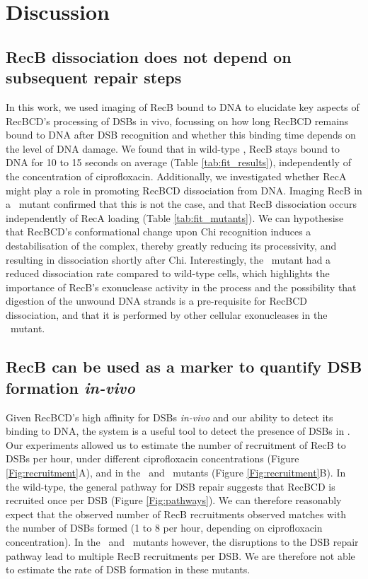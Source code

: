 \section*{Discussion}

\subsection*{RecB dissociation does not depend on subsequent repair steps}
In this work, we used imaging of RecB bound to DNA to elucidate key aspects of RecBCD's processing of DSBs in vivo, focussing on how long RecBCD remains bound to DNA after DSB recognition and whether this binding time depends on the level of DNA damage. We found that in wild-type \ecoli, RecB stays bound to DNA for 10 to 15 seconds on average (Table \ref{tab:fit_results}), independently of the concentration of ciprofloxacin. Additionally, we investigated whether RecA might play a role in promoting RecBCD dissociation from DNA. Imaging RecB in a \dreca\ mutant confirmed that this is not the case, and that RecB dissociation occurs independently of RecA loading (Table \ref{tab:fit_mutants}). We can hypothesise that RecBCD's conformational change upon Chi recognition induces a destabilisation of the complex, thereby greatly reducing its processivity, and resulting in dissociation shortly after Chi. Interestingly, the \geneteneighty\ mutant had a reduced dissociation rate compared to wild-type cells, which highlights the importance of RecB's exonuclease activity in the process and the possibility that digestion of the unwound DNA strands is a pre-requisite for RecBCD dissociation, and that it is performed by other cellular exonucleases in the \geneteneighty\ mutant.

\subsection*{RecB can be used as a marker to quantify DSB formation \emph{in-vivo}}
Given RecBCD's high affinity for DSBs \emph{in-vivo} and our ability to detect its binding to DNA, the system is a useful tool to detect the presence of DSBs in \ecoli. Our experiments allowed us to estimate the number of recruitment of RecB to DSBs per hour, under different ciprofloxacin concentrations (Figure \ref{Fig:recruitment}A), and in the \dreca\ and \geneteneighty\ mutants (Figure \ref{Fig:recruitment}B). In the wild-type, the general pathway for DSB repair suggests that RecBCD is recruited once per DSB (Figure \ref{Fig:pathways}). We can therefore reasonably expect that the observed number of RecB recruitments observed matches with the number of DSBs formed (1 to 8 per hour, depending on ciprofloxacin concentration). In the \dreca\ and \geneteneighty\ mutants however, the disruptions to the DSB repair pathway lead to multiple RecB recruitments per DSB. We are therefore not able to estimate the rate of DSB formation in these mutants.

